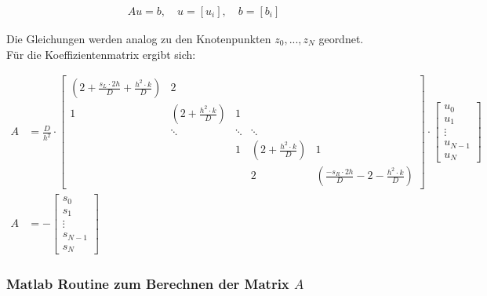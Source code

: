 \documentclass[
	pagesize,
	fontsize=12pt,
	paper=a4,
	oneside,
   reqno
]{scrartcl}
\begin{document}
\begin{align}
   \label{eq:eq7}
   Au = b, \quad u = [u_i], \quad b = [b_i]
\end{align}

Die Gleichungen werden analog zu den Knotenpunkten $z_0, ... , z_N$ geordnet. \\

Für die Koeffizientenmatrix ergibt sich:

\begin{align*}
   A &= \frac{D}{h^2}\cdot
   \begin{bmatrix*}
      \left( 2+\frac{s_L\cdot 2h}{D}+\frac{h^2\cdot k}{D}\right)  & 2 \\
                     1                                            & \left( 2+\frac{h^2\cdot k}{D}\right) & 1 \\
                                                                  & \ddots                               & \ddots & \ddots \\
                                                                                                         &        & 1   & \left( 2+\frac{h^2\cdot k}{D}\right) & 1 \\
                                                                                                         &        &     & 2                                    & \left( \frac{-s_R\cdot 2h}{D}-2-\frac{h^2\cdot k}{D}\right)
   \end{bmatrix*}
   \cdot
   \begin{bmatrix*}
      u_0 \\
      u_1 \\
      \vdots \\
      u_{N-1} \\
      u_N
   \end{bmatrix*}
   \\
   A &= -
   \begin{bmatrix*}
      s_0 \\
      s_1 \\
      \vdots \\
      s_{N-1} \\
      s_N
   \end{bmatrix*}
\end{align*}

\subsubsection{Matlab Routine zum Berechnen der Matrix $A$} \label{sec:test_lin}
\end{document}
